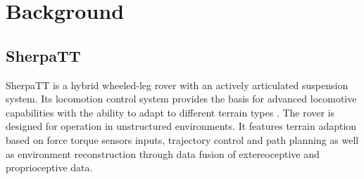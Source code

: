 \documentclass{article}
\begin{document}

\section{Background}


\subsection{SherpaTT}

SherpaTT is a hybrid wheeled-leg rover with an actively articulated suspension system. Its locomotion control system provides the basis for advanced locomotive capabilities with the ability to adapt to different terrain types \cite{cordes2018}. The rover is designed for operation in unstructured environments. It features terrain adaption based on force torque sensors inputs, trajectory control and path planning as well as environment reconstruction through data fusion of extereoceptive and proprioceptive data.
\end{document}
